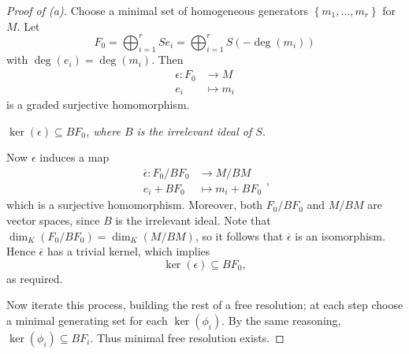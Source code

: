 \documentclass[co439]{subfiles}
\begin{document}
    \begin{proof}[Proof of (a)]\qedplacedtrue
        Choose a minimal set of homogeneous generators $\left\lbrace m_1,\ldots,m_r \right\rbrace$ for $M$. Let
        \begin{equation*}
            F_0 = \bigoplus^{r}_{i=1} Se_i = \bigoplus^{r}_{i=1} S\left( -\deg\left( m_i \right) \right)
        \end{equation*}
        with $\deg\left( e_i \right) = \deg\left( m_i \right)$. Then
        \begin{equation*}
            \begin{aligned}
                \epsilon:F_0&\to M \\
                e_i&\mapsto m_i
            \end{aligned} 
        \end{equation*}
        is a graded surjective homomorphism.

        \begin{claim}
            \textit{$\ker\left( \epsilon \right)\subseteq BF_0$, where $B$ is the irrelevant ideal of $S$.}

            Now $\epsilon$ induces a map
            \begin{equation*}
                \begin{aligned}
                    \overline{\epsilon}: F_0 /BF_0 &\to M /BM \\
                    e_i + BF_0 &\mapsto m_i + BF_0
                \end{aligned} ,
            \end{equation*}
            which is a surjective homomorphism. Moreover, both $F_0 /BF_0$ and $M /BM$ are vector spaces, since $B$ is the irrelevant ideal. Note that $\dim_K\left( F_0 /BF_0 \right) = \dim_K\left( M /BM \right)$, so it follows that $\overline{\epsilon}$ is an isomorphism. Hence $\overline{\epsilon}$ has a trivial kernel, which implies
            \begin{equation*}
                \ker\left( \epsilon \right)\subseteq BF_0,
            \end{equation*}
            as required.
        \end{claim}

        Now iterate this process, building the rest of a free resolution; at each step choose a minimal generating set for each $\ker\left( \phi_i \right)$. By the same reasoning, $\ker\left( \phi_i \right)\subseteq BF_i$. Thus minimal free resolution exists.
    \end{proof}
    
\end{document}
